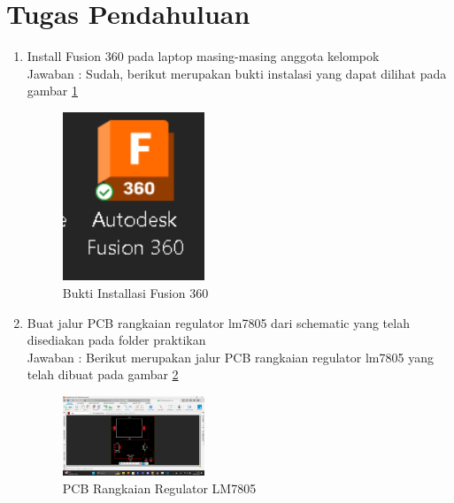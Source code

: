 \section*{Tugas Pendahuluan}
\begin{enumerate}
  \item Install Fusion 360 pada laptop masing-masing anggota kelompok \\
  Jawaban : Sudah, berikut merupakan bukti instalasi yang dapat dilihat pada gambar \ref{fig:bukti-instalasi}

  \begin{figure}[htbp]
    \centering
    \includegraphics[width=0.4\textwidth]{img/bukti.png}
    \caption{Bukti Installasi Fusion 360}
    \label{fig:bukti-instalasi}
\end{figure}

  \item Buat jalur PCB rangkaian regulator lm7805 dari schematic yang telah disediakan pada folder praktikan \\
  Jawaban : Berikut merupakan jalur PCB rangkaian regulator lm7805 yang telah dibuat pada gambar \ref{fig:regulator-lm7805}
  
  \begin{figure}[htbp]
    \centering
    \includegraphics[width=0.4\textwidth]{img/pcb-lm7805.png}
    \caption{PCB Rangkaian Regulator LM7805}
    \label{fig:regulator-lm7805}
  \end{figure}

\end{enumerate}

\newpage